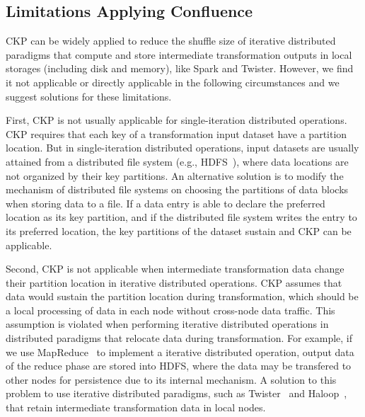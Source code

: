 \documentclass[10pt,journal,compsoc]{IEEEtran}
\begin{document}
\subsection{Limitations Applying Confluence}\label{section:limitation}
CKP can be widely applied to reduce the shuffle size of iterative
distributed paradigms that compute and store intermediate transformation outputs in
local storages (including disk and memory), like Spark and Twister.
However, we find it not applicable or directly applicable in the following 
circumstances and we suggest solutions for these limitations.

First, CKP is not usually applicable for single-iteration distributed operations. 
CKP requires that each key of a transformation input dataset have a partition location. 
But in single-iteration distributed operations, input datasets are usually attained 
from a distributed file system (e.g., HDFS~\cite{shvachko2010hadoop}), where data locations are not organized by their key partitions. 
An alternative solution is to modify the mechanism of distributed file systems on choosing the
partitions of data blocks when storing data to a file.
If a data entry is able to declare the preferred location as its key partition, and if the distributed file system writes the entry to its preferred location, the key partitions of the dataset sustain and CKP can be applicable. 

Second, CKP is not applicable when intermediate transformation data change
their partition location in iterative distributed operations. 
CKP assumes that data would sustain the partition location during 
transformation, which should be a local processing of data in each node 
without cross-node data traffic.
This assumption is violated when performing iterative distributed operations
in distributed paradigms that relocate data during transformation. 
For example, if we use MapReduce~\cite{dean2008mapreduce} to implement a iterative distributed operation, output data of the reduce phase are 
stored into HDFS, where the data may be transfered to other nodes for persistence due to its internal mechanism. 
A solution to this problem to use iterative distributed paradigms, such as Twister~\cite{ekanayake2010twister} and Haloop~\cite{bu2010haloop}, that retain intermediate transformation data in local nodes. 
\end{document}
